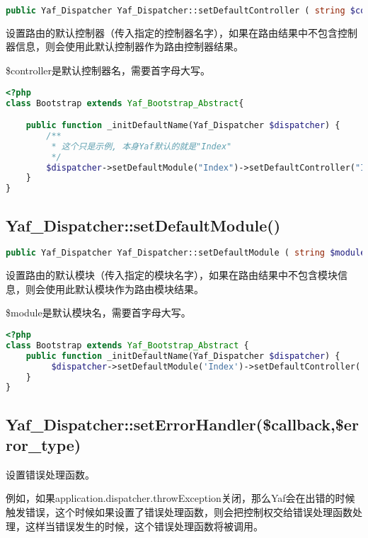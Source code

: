 \begin{lstlisting}[language=PHP]
public Yaf_Dispatcher Yaf_Dispatcher::setDefaultController ( string $controller )
\end{lstlisting}

设置路由的默认控制器（传入指定的控制器名字），如果在路由结果中不包含控制器信息，则会使用此默认控制器作为路由控制器结果。

\$controller是默认控制器名，需要首字母大写。

\begin{lstlisting}[language=PHP]
<?php
class Bootstrap extends Yaf_Bootstrap_Abstract{

    public function _initDefaultName(Yaf_Dispatcher $dispatcher) {
        /**
         * 这个只是示例, 本身Yaf默认的就是"Index"
         */
        $dispatcher->setDefaultModule("Index")->setDefaultController("Index")->setDefaultAction("index");
    }
}
\end{lstlisting}

\subsection{Yaf\_Dispatcher::setDefaultModule()}

\begin{lstlisting}[language=PHP]
public Yaf_Dispatcher Yaf_Dispatcher::setDefaultModule ( string $module )
\end{lstlisting}

设置路由的默认模块（传入指定的模块名字），如果在路由结果中不包含模块信息，则会使用此默认模块作为路由模块结果。

\$module是默认模块名，需要首字母大写。

\begin{lstlisting}[language=PHP]
<?php
class Bootstrap extends Yaf_Bootstrap_Abstract {
    public function _initDefaultName(Yaf_Dispatcher $dispatcher) {
         $dispatcher->setDefaultModule('Index')->setDefaultController('Index')->setDefaultAction('index');
    }
}
\end{lstlisting}

\subsection{Yaf\_Dispatcher::setErrorHandler(\$callback,\$error\_type)}

设置错误处理函数。


例如，如果application.dispatcher.throwException关闭，那么Yaf会在出错的时候触发错误，这个时候如果设置了错误处理函数，则会把控制权交给错误处理函数处理，这样当错误发生的时候，这个错误处理函数将被调用。

